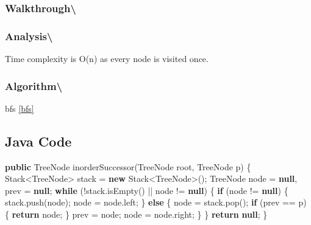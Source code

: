 \documentclass[]{book}
\newenvironment{Shaded}{\begin{snugshade}}{\end{snugshade}}
\newcommand{\BuiltInTok}[1]{#1}
\newcommand{\FunctionTok}[1]{\textcolor[rgb]{0.00,0.00,0.00}{#1}}
\newcommand{\KeywordTok}[1]{\textcolor[rgb]{0.13,0.29,0.53}{\textbf{#1}}}
\newcommand{\NormalTok}[1]{#1}
\begin{document}
\hypertarget{walkthrough-81}{%
\subsubsection{Walkthrough\textbackslash{}}\label{walkthrough-81}}

\hypertarget{analysis-88}{%
\subsubsection{Analysis\textbackslash{}}\label{analysis-88}}

Time complexity is O(n) as every node is visited once.

\hypertarget{algorithm-89}{%
\subsubsection{Algorithm\textbackslash{}}\label{algorithm-89}}

bfs \ref{bfs}

\hypertarget{java-code-51}{%
\subsection{Java Code}\label{java-code-51}}

\begin{Shaded}
\begin{Highlighting}[]
\KeywordTok{public} \BuiltInTok{TreeNode} \FunctionTok{inorderSuccessor}\NormalTok{(}\BuiltInTok{TreeNode}\NormalTok{ root, }\BuiltInTok{TreeNode}\NormalTok{ p) \{}
    \BuiltInTok{Stack}\NormalTok{<}\BuiltInTok{TreeNode}\NormalTok{> stack = }\KeywordTok{new} \BuiltInTok{Stack}\NormalTok{<}\BuiltInTok{TreeNode}\NormalTok{>();}
    \BuiltInTok{TreeNode}\NormalTok{ node = }\KeywordTok{null}\NormalTok{, prev = }\KeywordTok{null}\NormalTok{;}
    \KeywordTok{while}\NormalTok{ (!stack.}\FunctionTok{isEmpty}\NormalTok{() || node != }\KeywordTok{null}\NormalTok{) \{}
        \KeywordTok{if}\NormalTok{ (node != }\KeywordTok{null}\NormalTok{) \{}
\NormalTok{            stack.}\FunctionTok{push}\NormalTok{(node);}
\NormalTok{            node = node.}\FunctionTok{left}\NormalTok{;}
\NormalTok{        \} }\KeywordTok{else}\NormalTok{ \{}
\NormalTok{            node = stack.}\FunctionTok{pop}\NormalTok{();}
            \KeywordTok{if}\NormalTok{ (prev == p) \{}
                \KeywordTok{return}\NormalTok{ node;}
\NormalTok{            \}}
\NormalTok{            prev = node;}
\NormalTok{            node = node.}\FunctionTok{right}\NormalTok{;}
\NormalTok{        \}}
\NormalTok{    \}}
    \KeywordTok{return} \KeywordTok{null}\NormalTok{;}
\NormalTok{\}}
\end{Highlighting}
\end{Shaded}
\end{document}
